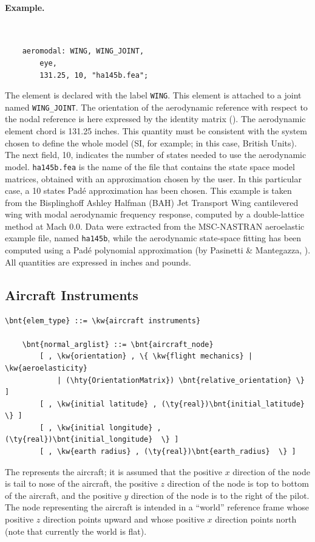 \paragraph{Example.} \
\begin{verbatim}
    aeromodal: WING, WING_JOINT,
        eye,
        131.25, 10, "ha145b.fea";
\end{verbatim}
The  element is declared with the label \texttt{WING}.
This element is attached to a \kw{modal} joint
named \texttt{WING\_JOINT}.
The orientation of the aerodynamic reference with respect
to the nodal reference is here expressed by the identity matrix ().
The aerodynamic element chord is 131.25 inches.
This quantity must be consistent with the system chosen to define
the whole model (SI, for example; in this case, British Units).
The next field, 10, indicates the number of states needed to use
the aerodynamic model.
\texttt{ha145b.fea} is the name of the file that contains
the state space model matrices, obtained with an approximation
chosen by the user.
In this particular case, a 10 states Pad\'e approximation
has been chosen.
This example is taken from the Bisplinghoff Ashley Halfman
(BAH) Jet Transport Wing cantilevered wing with modal aerodynamic
frequency response, computed by a double-lattice method at Mach 0.0.
Data were extracted from the MSC-NASTRAN aeroelastic example file,
named \texttt{ha145b}, while the aerodynamic state-space fitting
has been computed using a Pad\'e polynomial approximation
(by Pasinetti \& Mantegazza, \cite{PASINETTI-MANTEGAZZA-1999}).
All quantities are expressed in inches and pounds.



\subsection{Aircraft Instruments}
\begin{Verbatim}[commandchars=\\\{\}]
    \bnt{elem_type} ::= \kw{aircraft instruments}

    \bnt{normal_arglist} ::= \bnt{aircraft_node}
        [ , \kw{orientation} , \{ \kw{flight mechanics} | \kw{aeroelasticity}
            | (\hty{OrientationMatrix}) \bnt{relative_orientation} \} ]
	    [ , \kw{initial latitude} , (\ty{real})\bnt{initial_latitude}  \} ]
	    [ , \kw{initial longitude} , (\ty{real})\bnt{initial_longitude}  \} ]
	    [ , \kw{earth radius} , (\ty{real})\bnt{earth_radius}  \} ]
\end{Verbatim}
The  represents the aircraft; it is assumed
that the positive $x$ direction of the node is tail to nose of the aircraft,
the positive $z$ direction of the node is top to bottom of the aircraft,
and the positive $y$ direction of the node is to the right of the pilot.
The node representing the aircraft is intended in a ``world''
reference frame whose positive $z$ direction points upward
and whose positive $x$ direction points north
(note that currently the world is flat).

